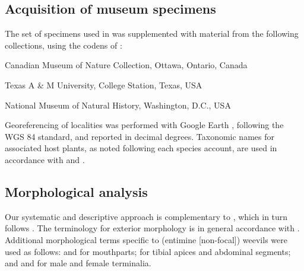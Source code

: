 \documentclass[fleqn,10pt,lineno]{wlpeerj} %
\begin{document}
	\subsection*{Acquisition of museum specimens}\label{ssec:museum} 
		The set of specimens used in \citet{jansen2015} was supplemented with material from the following collections, using the codens of \citet{arnett1993}:
		
		\begin{description}[itemsep=-1ex]
			\item[\texttt{CMNC}] Canadian Museum of Nature Collection, Ottawa, Ontario, Canada
			\item[\texttt{TAMU}] Texas A \& M University, College Station, Texas, USA
			\item[\texttt{USNM}] National Museum of Natural History, Washington, D.C., USA
		\end{description}

			Georeferencing of localities was performed with Google Earth \citep{google2018}, following the WGS 84 standard, and reported in decimal degrees.
		Taxonomic names for associated host plants, as noted following each species account, are used in accordance with \citet{munz1973} and \citet{seinet2018}.
		
	\subsection*{Morphological analysis}\label{ssec:morph} 
		Our systematic and descriptive approach is complementary to \citet{jansen2015}, which in turn follows \citet{franz2010a, franz2010b, franz2012}.
		The terminology for exterior morphology is in general accordance with \citet{torre1989}.
		Additional morphological terms specific to (entimine [non-focal]) weevils were used as follows:
			\citet{ting1936} and \citet{morimoto2003} for mouthparts;
			\citet{thompson1992} for tibial apices and abdominal segments;
			and \citet{oberprieler2014} and \citet{howden1995} for male and female terminalia.
		
\end{document}
